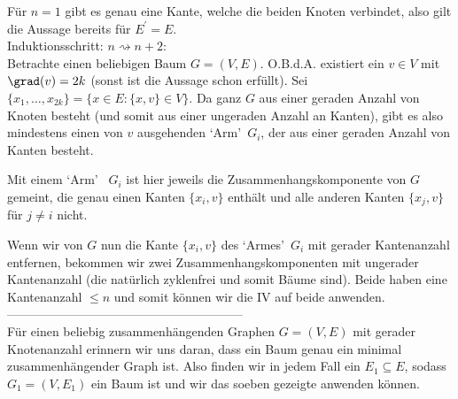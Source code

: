 \begin{solution}
Für $n = 1$ gibt es genau eine Kante, welche die beiden Knoten verbindet,
also gilt die Aussage bereits für $E^{\prime} = E$. \\

Induktionsschritt: $n \rightsquigarrow n + 2$: \\
Betrachte einen beliebigen Baum $G = (V,E)$.
O.B.d.A. existiert ein $v \in V$ mit $\grad(v) = 2k$ (sonst ist die Aussage schon erfüllt). Sei $\{x_1,\dots,x_{2k}\} = \{x \in E: \{x,v \} \in V\}$.
Da ganz $G$ aus einer geraden Anzahl von Knoten besteht (und somit aus einer ungeraden Anzahl an Kanten), gibt es also mindestens einen von $v$ ausgehenden \textquoteleft{Arm}\textquoteright ~$G_i$, der aus einer geraden Anzahl von Kanten besteht.

Mit einem \textquoteleft{Arm}\textquoteright ~ $G_i$ ist hier jeweils die Zusammenhangskomponente von $G$ gemeint, die genau einen Kanten $\{x_i,v\}$ enthält und alle anderen Kanten $\{x_j,v\}$ für $j \neq i$ nicht.

Wenn wir von $G$ nun die Kante $\{x_i,v\}$ des \textquoteleft{Armes}\textquoteright ~$G_i$ mit gerader Kantenanzahl entfernen, bekommen wir zwei Zusammenhangskomponenten mit ungerader Kantenanzahl (die natürlich zyklenfrei und somit Bäume sind). Beide haben eine Kantenanzahl $\leq n$ und somit können wir die IV auf beide anwenden. \\

---------------------------------------------------------\\


Für einen beliebig zusammenhängenden Graphen $G = (V,E)$ mit gerader Knotenanzahl
erinnern wir uns daran, dass
ein Baum genau ein minimal zusammenhängender Graph ist.
Also finden wir in jedem Fall ein $E_1 \subseteq E$, sodass $G_1 = (V,E_1)$
ein Baum ist und wir das soeben gezeigte anwenden können.

\end{solution}

